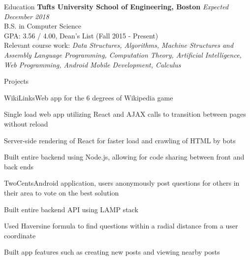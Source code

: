 \documentclass{resume}
\begin{document}
  \begin{rSection}{Education}
    {\bf Tufts University School of Engineering, Boston} \hfill {\em Expected December 2018} \\ 
    { B.S. in Computer Science} \\
    GPA: 3.56 / 4.00, Dean's List (Fall 2015 - Present)\\
    Relevant course work: \textit{Data Structures, Algorithms, Machine Structures and Assembly Language Programming, Computation Theory, Artificial Intelligence, Web Programming, Android Mobile Development, Calculus}
  \end{rSection}
  
  \begin{rSection}{Projects}
  
  \begin{rSubsection}{WikiLinks}{}{\normalfont Web app for the 6 degrees of Wikipedia game}{}
  \item Single load web app utilizing React and AJAX calls to transition between pages without reload
  \item Server-side rendering of React for faster load and crawling of HTML by bots
  \item Built entire backend using Node.js, allowing for code sharing between front and back ends
  \end{rSubsection}
  
  \begin{rSubsection}{TwoCents}{}{\normalfont Android application, users anonymously post questions for others in their area to vote on the best solution}{}
    \item Built entire backend API using LAMP stack  
    \item Used Haversine formula to find questions within a radial distance from a user coordinate
    \item Built app features such as creating new posts and viewing nearby posts
  \end{rSubsection}
   
  \end{rSection}
  
\end{document}
